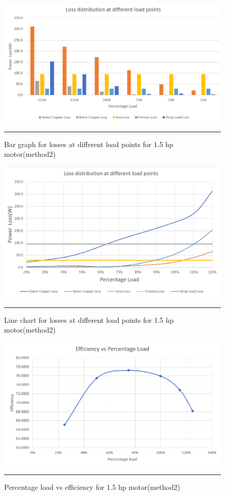\begin{figure}[hbtp!]
	\centering
		\includegraphics[width = 4.5in]{./Figures/MS/fig519.png}
		\rule{35em}{0.5pt}
	\caption{Bar graph for losses at different load points for 1.5 hp motor(method2)}
	\label{fig:Bar graph for losses at different load points for 1.5 hp motor(method2)} 
\end{figure}

\begin{figure}[hbtp!]
	\centering
		\includegraphics[width = 4.5in]{./Figures/MS/fig520.png}
		\rule{35em}{0.5pt}
	\caption{Line chart for losses at different load points for 1.5 hp motor(method2)}
	\label{fig:Line chart for losses at different load points for 1.5 hp motor(method2)} 
\end{figure}

\begin{figure}[hbtp!]
	\centering
		\includegraphics[width = 4.5in]{./Figures/MS/fig521.png}
		\rule{35em}{0.5pt}
	\caption{Percentage load vs efficiency for 1.5 hp motor(method2)}
	\label{fig:Percentage load vs efficiency for 1.5 hp motor(method2)} 
\end{figure}

